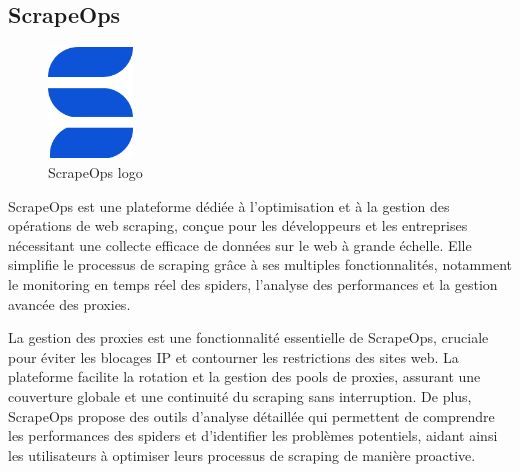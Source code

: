 \documentclass[a4paper,12pt]{report}
\numberwithin{equation}{section}
\begin{document}
\subsection{ScrapeOps}
\begin{figure}[H]
    \centering
    \includegraphics[width=0.2\textwidth]{tech/scrapeops-logo.png}
    \caption{ScrapeOps logo}
    \label{fig:ScrapeOps logo}
\end{figure}
\par
ScrapeOps est une plateforme dédiée à l'optimisation et à la gestion des opérations de web scraping, conçue pour les développeurs et les entreprises nécessitant une collecte efficace de données sur le web à grande échelle. Elle simplifie le processus de scraping grâce à ses multiples fonctionnalités, notamment le monitoring en temps réel des spiders, l'analyse des performances et la gestion avancée des proxies.
\\ \par
La gestion des proxies est une fonctionnalité essentielle de ScrapeOps, cruciale pour éviter les blocages IP et contourner les restrictions des sites web. La plateforme facilite la rotation et la gestion des pools de proxies, assurant une couverture globale et une continuité du scraping sans interruption. De plus, ScrapeOps propose des outils d'analyse détaillée qui permettent de comprendre les performances des spiders et d'identifier les problèmes potentiels, aidant ainsi les utilisateurs à optimiser leurs processus de scraping de manière proactive.
\newpage
\end{document}
